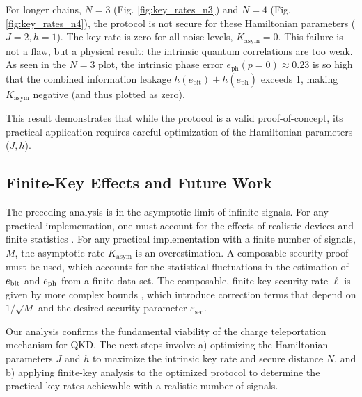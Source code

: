 For longer chains, $N=3$ (Fig. \ref{fig:key_rates_n3}) and $N=4$ (Fig. \ref{fig:key_rates_n4}), the protocol is not secure for these Hamiltonian parameters ($J=2, h=1$). The key rate is zero for all noise levels, $K_{\text{asym}} = 0$. This failure is not a flaw, but a physical result: the intrinsic quantum correlations are too weak. As seen in the $N=3$ plot, the intrinsic phase error $e_{\text{ph}}(p=0) \approx 0.23$ is so high that the combined information leakage $h(e_{\text{bit}}) + h(e_{\text{ph}})$ exceeds 1, making $K_{\text{asym}}$ negative (and thus plotted as zero).

This result demonstrates that while the protocol is a valid proof-of-concept, its practical application requires careful optimization of the Hamiltonian parameters ($J, h$).

\subsection{Finite-Key Effects and Future Work}
\label{sec:finite_key}

The preceding analysis is in the asymptotic limit of infinite signals. For any practical implementation, one must account for the effects of realistic devices and finite statistics \cite{Xu2020, Renner2005}. For any practical implementation with a finite number of signals, $M$, the asymptotic rate $K_{\text{asym}}$ is an overestimation. A composable security proof must be used, which accounts for the statistical fluctuations in the estimation of $e_{\rm bit}$ and $e_{\rm ph}$ from a finite data set. The composable, finite-key security rate $\ell$ is given by more complex bounds \cite{Tomamichel2012, Lim2014}, which introduce correction terms that depend on $1/\sqrt{M}$ and the desired security parameter $\varepsilon_{\text{sec}}$.

Our analysis confirms the fundamental viability of the charge teleportation mechanism for QKD. The next steps involve a) optimizing the Hamiltonian parameters $J$ and $h$ to maximize the intrinsic key rate and secure distance $N$, and b) applying finite-key analysis to the optimized protocol to determine the practical key rates achievable with a realistic number of signals.
